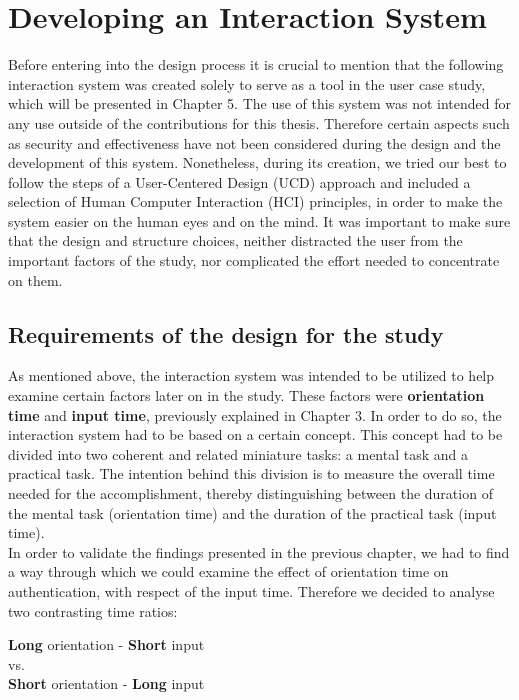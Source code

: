 
\chapter{Developing an Interaction System}\label{ch:forth}


Before entering into the design process it is crucial to mention that the following interaction system was created solely to serve as a tool in the user case study, which will be presented in Chapter 5. The use of this system was not intended for any use outside of the contributions for this thesis. Therefore certain aspects such as security and effectiveness have not been considered during the design and the development of this system. Nonetheless, during its creation, we tried our best to follow the steps of a User-Centered Design (UCD) approach and included a selection of Human Computer Interaction (HCI) principles, in order to make the system easier on the human eyes and on the mind. It was important to make sure that the design and structure choices, neither distracted the user from the important factors of the study, nor complicated the effort needed to concentrate on them.  

\section{Requirements of the design for the study}
As mentioned above, the interaction system was intended to be utilized to help examine certain factors later on in the study. These factors were \textbf{orientation time} and \textbf{input time}, previously explained in Chapter 3. In order to do so, the interaction system had to be based on a certain concept. This concept had to be divided into two coherent and related miniature tasks: a mental task and a practical task. The intention behind this division is to measure the overall time needed for the accomplishment, thereby distinguishing between the duration of the mental task (orientation time) and the duration of the practical task (input time). \\

In order to validate the findings presented in the previous chapter, we had to find a way through which we could examine the effect of orientation time on authentication, with respect of the input time. Therefore we decided to analyse two contrasting time ratios: 
\begin{center}
    \textbf{Long} orientation - \textbf{Short} input \\
    vs. \\
    \textbf{Short} orientation - \textbf{Long} input
\end{center} 

